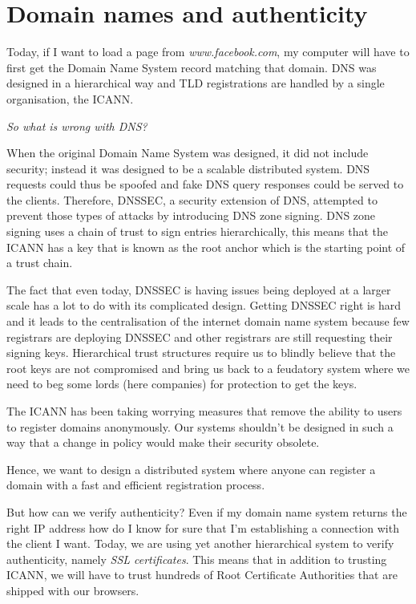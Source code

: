 \documentclass{vldb}
\begin{document}
\section{Domain names and authenticity}

Today, if I want to load a page from \emph{www.facebook.com}, my computer will have to first get the Domain Name System record matching that domain. DNS was designed in a hierarchical way and TLD registrations are handled by a single organisation, the ICANN.

\emph{So what is wrong with DNS?}

When the original Domain Name System was designed, it did not include security; instead it was designed to be a scalable distributed system. DNS requests could thus be spoofed and fake DNS query responses could be served to the clients. Therefore, DNSSEC, a security extension of DNS, attempted to prevent those types of attacks by introducing DNS zone signing. DNS zone signing uses a chain of trust to sign entries hierarchically, this means that the ICANN has a key that is known as the root anchor which is the starting point of a trust chain.

The fact that even today, DNSSEC is having issues being deployed at a larger scale has a lot to do with its complicated design. Getting DNSSEC right is hard and it leads to the centralisation of the internet domain name system because few registrars are deploying DNSSEC and other registrars are still requesting their signing keys. Hierarchical trust structures require us to blindly believe that the root keys are not compromised and bring us back to a feudatory system where we need to beg some lords (here companies) for protection to get the keys.

The ICANN has been taking worrying measures that remove the ability to users to register domains anonymously\cite{icannabuse}. Our systems shouldn't be designed in such a way that a change in policy would make their security obsolete. 

Hence, we want to design a distributed system where anyone can register a domain with a fast and efficient registration process.

But how can we verify authenticity? 
Even if my domain name system returns the right IP address how do I know for sure that I'm establishing a connection with the client I want. Today, we are using yet another hierarchical system to verify authenticity, namely \emph{SSL certificates}. This means that in addition to trusting ICANN, we will have to trust hundreds of Root Certificate Authorities that are shipped with our browsers.\cite{mozillaSSL}
\end{document}
